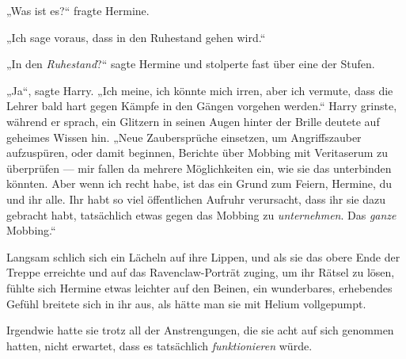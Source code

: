 „Was ist es?“ fragte Hermine.

„Ich sage voraus, dass \SPHEW in den Ruhestand gehen wird.“

„In den \emph{Ruhestand}?“ sagte Hermine und stolperte fast über eine der Stufen.

„Ja“, sagte Harry.
„Ich meine, ich könnte mich irren, aber ich vermute, dass die Lehrer bald hart gegen Kämpfe in den Gängen vorgehen werden.“ Harry grinste, während er sprach, ein Glitzern in seinen Augen hinter der Brille deutete auf geheimes Wissen hin.
„Neue Zaubersprüche einsetzen, um Angriffszauber aufzuspüren, oder damit beginnen, Berichte über Mobbing mit Veritaserum zu überprüfen — mir fallen da mehrere Möglichkeiten ein, wie sie das unterbinden könnten. Aber wenn ich recht habe, ist das ein Grund zum Feiern, Hermine, du und ihr alle. Ihr habt so viel öffentlichen Aufruhr verursacht, dass ihr sie dazu gebracht habt, tatsächlich etwas gegen das Mobbing zu \emph{unternehmen}. Das \emph{ganze} Mobbing.“

Langsam schlich sich ein Lächeln auf ihre Lippen, und als sie das obere Ende der Treppe erreichte und auf das Ravenclaw-Porträt zuging, um ihr Rätsel zu lösen, fühlte sich Hermine etwas leichter auf den Beinen, ein wunderbares, erhebendes Gefühl breitete sich in ihr aus, als hätte man sie mit Helium vollgepumpt.

Irgendwie hatte sie trotz all der Anstrengungen, die sie acht auf sich genommen hatten, nicht erwartet, dass es tatsächlich \emph{funktionieren} würde.

